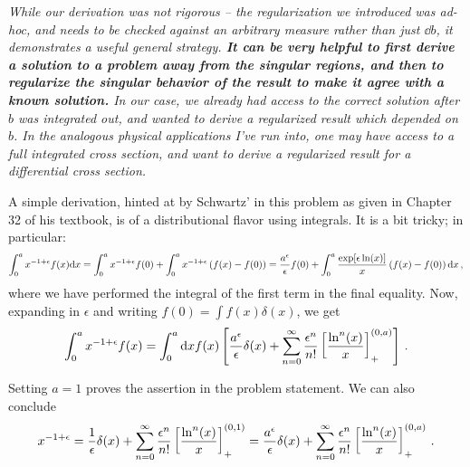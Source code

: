 \begin{remarkbox*}{}{}
\textit{
    While our derivation was not rigorous -- the regularization we introduced was ad-hoc, and needs to be checked against an arbitrary measure rather than just \(\dd b\), it demonstrates a useful general strategy.
    \textbf{It can be very helpful to first derive a solution to a problem away from the singular regions, and then to regularize the singular behavior of the result to make it agree with a known solution.}
    In our case, we already had access to the correct solution after \(b\) was integrated out, and wanted to derive a regularized result which depended on \(b\).
    In the analogous physical applications I've run into, one may have access to a full integrated cross section, and want to derive a regularized result for a differential cross section.
}
\end{remarkbox*}




A simple derivation, hinted at by Schwartz' in this problem as given in Chapter 32 of his textbook, is of a distributional flavor using integrals.
%
It is a bit tricky;
%
in particular:
\begin{align}
    \int_0^a x^{-1+\epsilon} f(x) \dd x
    =
    \int_0^a x^{-1+\epsilon} f(0)
    +
    \int_0^a x^{-1+\epsilon} \left(f(x) - f(0)\right)
    =
    \frac{a^\epsilon}{\epsilon} f(0)
    +
    \int_0^a \frac{\exp[\epsilon \ln(x)]}{x} \left(f(x) - f(0)\right) \dd x
    \,,
\end{align}
where we have performed the integral of the first term in the final equality.
%
Now, expanding in \(\epsilon\) and writing \(f(0) = \int f(x) \delta(x)\), we get
\begin{align}
    \int_0^a x^{-1+\epsilon} f(x)
    =
    \int_0^a \dd x
    f(x)
    \left[
        \frac{a^\epsilon}{\epsilon}\delta(x)
        +
        \sum_{n=0}^\infty
        \frac{\epsilon^n}{n!}
        \left[\frac{\ln^n(x)}{x}\right]^{(0,a)}_+
    \right]
    \,.
\end{align}

Setting \(a = 1\) proves the assertion in the problem statement.
%
We can also conclude
\begin{align}
    x^{-1 + \epsilon}
    =
    \frac{1}{\epsilon} \delta(x)
    +
    \sum_{n=0}^\infty
    \frac{\epsilon^n}{n!}
    \left[\frac{\ln^n(x)}{x}\right]_+^{(0,1)}
    =
    \frac{a^\epsilon}{\epsilon} \delta(x)
    +
    \sum_{n=0}^\infty
    \frac{\epsilon^n}{n!}
    \left[\frac{\ln^n(x)}{x}\right]_+^{(0,a)}
    \,.
\end{align}

